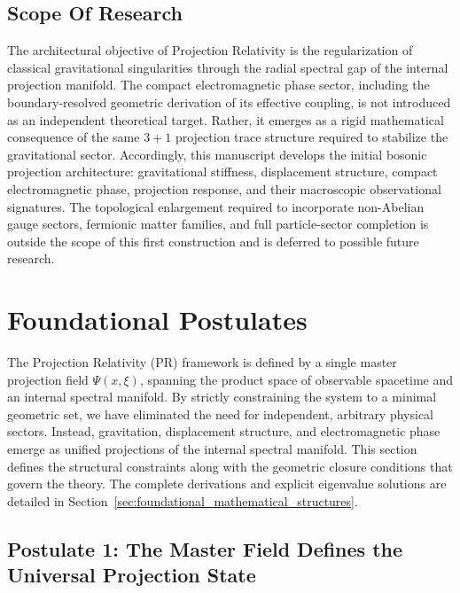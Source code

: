 \documentclass[11pt]{article}
\begin{document}
\subsection{Scope Of Research}
The architectural objective of Projection Relativity is the
regularization of classical gravitational singularities  \cite{Bardeen1968,Hayward2006} through the radial spectral gap of the internal projection manifold. The compact electromagnetic phase sector, including the boundary-resolved geometric derivation of its effective coupling, is not introduced as an independent theoretical target. Rather, it emerges as a rigid mathematical consequence of the same \(3+1\) projection trace structure required to stabilize the gravitational
sector. Accordingly, this manuscript develops the initial bosonic projection
architecture: gravitational stiffness, displacement structure, compact
electromagnetic phase, projection response, and their macroscopic observational signatures. The topological enlargement required to incorporate non-Abelian gauge sectors, fermionic matter families, and full particle-sector completion is outside the scope of this first construction and is deferred to possible future research.

\section{Foundational Postulates}
\label{sec:master_projection_field_foundational_postulates}

The Projection Relativity (PR) framework is defined by a single master projection field $\Psi(x, \xi)$, spanning the product space of observable spacetime and an internal spectral manifold. By strictly constraining the system to a minimal geometric set, we have eliminated the need for independent, arbitrary physical sectors. Instead, gravitation, displacement structure, and electromagnetic phase emerge as unified projections of the internal spectral manifold. This section defines the structural constraints along with the geometric closure conditions that govern the theory. The complete derivations and explicit eigenvalue solutions are detailed in Section~\ref{sec:foundational_mathematical_structures}.

\subsection{Postulate 1: The Master Field Defines the Universal Projection State}
\label{sec:postulate_master_field_universal_projection_state}
\end{document}
